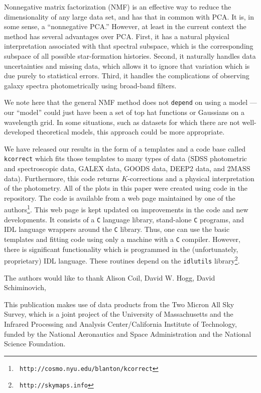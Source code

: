\documentclass[10pt,preprint]{aastex}
\begin{document}
Nonnegative matrix factorization (NMF) is an effective way to reduce
the dimensionality of any large data set, and has that in common with
PCA.  It is, in some sense, a ``nonnegative PCA.''  However, at least
in the current context the method has several advantages over
PCA. First, it has a natural physical interpretation associated with
that spectral subspace, which is the corresponding subspace of all
possible star-formation histories. Second, it naturally handles data
uncertainties and missing data, which allows it to ignore that
variation which is due purely to statistical errors.  Third, it
handles the complications of observing galaxy spectra photometrically
using broad-band filters. 

We note here that the general NMF method does not {\tt depend} on
using a model --- our ``model'' could just have been a set of top hat
functions or Gaussians on a wavelength grid. In some situations, such
as datasets for which there are not well-developed theoretical models,
this approach could be more appropriate.

We have released our results in the form of a templates and a code
base called {\tt kcorrect} which fits those templates to many types of
data (SDSS photometric and spectroscopic data, GALEX data, GOODS data,
DEEP2 data, and 2MASS data). Furthermore, this code returns
$K$-corrections and a physical interpretation of the photometry. All
of the plots in this paper were created using code in the
repository. The code is available from a web page maintained by one of
the authors\footnote{{\tt
http://cosmo.nyu.edu/blanton/kcorrect}}. This web page is kept updated
on improvements in the code and new developments. It consists of a
{\tt C} language library, stand-alone {\tt C} programs, and IDL
language wrappers around the {\tt C} library. Thus, one can use the
basic templates and fitting code using only a machine with a {\tt C}
compiler. However, there is significant functionality which is
programmed in the (unfortunately, proprietary) IDL language. These
routines depend on the {\tt idlutils} library\footnote{{\tt
http://skymaps.info}}.

\acknowledgments

The authors would like to thank Alison Coil, David W. Hogg, David
Schiminovich, 

This publication makes use of data products from the Two Micron All
Sky Survey, which is a joint project of the University of
Massachusetts and the Infrared Processing and Analysis
Center/California Institute of Technology, funded by the National
Aeronautics and Space Administration and the National Science
Foundation.
\end{document}

